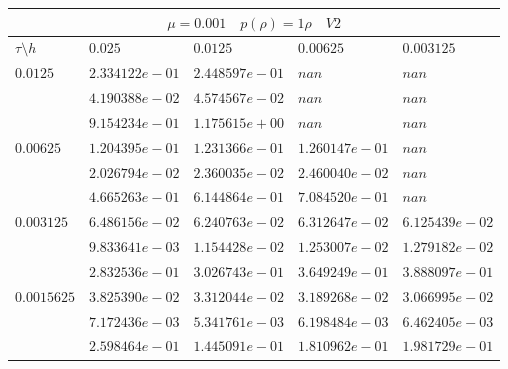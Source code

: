 \documentclass[a4paper,12pt]{extarticle}
\begin{document}
\begin{tabular}{|l|l|l|l|l|}
	\hline
	\multicolumn{5}{|c|}{$\mu =0.001 \quad  p(\rho) =1 \rho \quad V2$}\\
	\hline
	$\tau\setminus h$ & $0.025$ & $0.0125$ & $0.00625$ & $0.003125$\\
	\hline
	$0.0125$  & $2.334122e-01$ & $2.448597e-01$ & $nan$ & $nan$\\
	& $4.190388e-02$ & $4.574567e-02$ & $nan$ & $nan$\\
	& $9.154234e-01$ & $1.175615e+00$ & $nan$ & $nan$\\
	\hline
	$0.00625$  & $1.204395e-01$ & $1.231366e-01$ & $1.260147e-01$ & $nan$\\
	& $2.026794e-02$ & $2.360035e-02$ & $2.460040e-02$ & $nan$\\
	& $4.665263e-01$ & $6.144864e-01$ & $7.084520e-01$ & $nan$\\
	\hline
	$0.003125$  & $6.486156e-02$ & $6.240763e-02$ & $6.312647e-02$ & $6.125439e-02$\\
	& $9.833641e-03$ & $1.154428e-02$ & $1.253007e-02$ & $1.279182e-02$\\
	& $2.832536e-01$ & $3.026743e-01$ & $3.649249e-01$ & $3.888097e-01$\\
	\hline
	$0.0015625$  & $3.825390e-02$ & $3.312044e-02$ & $3.189268e-02$ & $3.066995e-02$\\
	& $7.172436e-03$ & $5.341761e-03$ & $6.198484e-03$ & $6.462405e-03$\\
	& $2.598464e-01$ & $1.445091e-01$ & $1.810962e-01$ & $1.981729e-01$\\
	\hline
\end{tabular}
\end{document}
